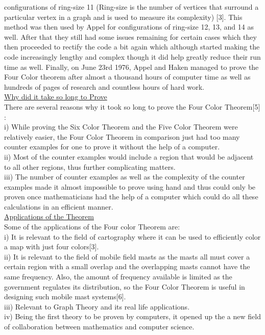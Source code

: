\documentclass[11pt]{article}
\begin{document}
configurations of ring-size 11 (Ring-size is the number of vertices that surround a particular vertex in a graph and is used to measure its complexity) [3]. This method was then used by Appel for configurations of ring-size 12, 13, and 14 as well. After that they still had some issues remaining for certain cases which they then proceeded to rectify the code a bit again which although started making the code increasingly lengthy and complex though it did help greatly reduce their run time as well. Finally, on June 23rd 1976, Appel and Haken managed to prove the Four Color theorem after almost a thousand hours of computer time as well as hundreds of pages of research and countless hours of hard work. \\
  
\noindent \underline{Why did it take so long to Prove}\\
There are several reasons why it took so long to prove the Four Color Theorem[5] :\\
i) While proving the Six Color Theorem and the Five Color Theorem were relatively easier, the Four Color Theorem in comparison just had too many counter examples for one to prove it without the help of a computer.\\
ii) Most of the counter examples would include a region that would be adjacent to all other regions, thus further complicating matters.\\
iii) The number of counter examples as well as the complexity of the counter examples made it almost impossible to prove using hand and thus could only be proven once mathematicians had the help of a computer which could do all these calculations in an efficient manner.\\

\noindent \underline{Applications of the Theorem}\\
Some of the applications of the Four color Theorem are:\\
i) It is relevant to the field of cartography where it can be used to efficiently color a map with just four colors[3].\\
ii) It is relevant to the field of mobile field masts as the masts all must cover a certain region with a small overlap and the overlapping masts cannot have the same frequency. Also, the amount of frequency available is limited as the government regulates its distribution, so the Four Color Theorem is useful in designing such mobile mast systems[6].\\
iii) Relevant to Graph Theory and its real life applications.\\
iv) Being the first theory to be proven by computers, it opened up the a new field of collaboration between mathematics and computer science.
\newpage
\end{document}
